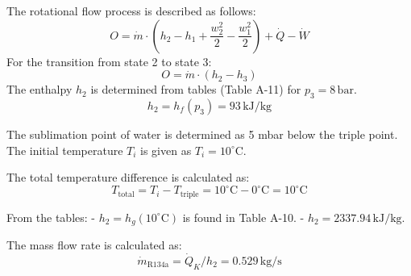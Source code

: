 The rotational flow process is described as follows:  
\[
O = \dot{m} \cdot (h_2 - h_1 + \frac{w_2^2}{2} - \frac{w_1^2}{2}) + \dot{Q} - \dot{W}
\]  
For the transition from state 2 to state 3:  
\[
O = \dot{m} \cdot (h_2 - h_3)
\]  
The enthalpy \( h_2 \) is determined from tables (Table A-11) for \( p_3 = 8 \, \text{bar} \).  
\[
h_2 = h_f(p_3) = 93 \, \text{kJ/kg}
\]

The sublimation point of water is determined as 5 mbar below the triple point. The initial temperature \( T_i \) is given as \( T_i = 10^\circ\text{C} \).  

The total temperature difference is calculated as:  
\[
T_{\text{total}} = T_i - T_{\text{triple}} = 10^\circ\text{C} - 0^\circ\text{C} = 10^\circ\text{C}
\]  

From the tables:  
- \( h_2 = h_g(10^\circ\text{C}) \) is found in Table A-10.  
- \( h_2 = 2337.94 \, \text{kJ/kg} \).  

The mass flow rate is calculated as:  
\[
\dot{m}_{\text{R134a}} = \dot{Q}_K / h_2 = 0.529 \, \text{kg/s}
\]